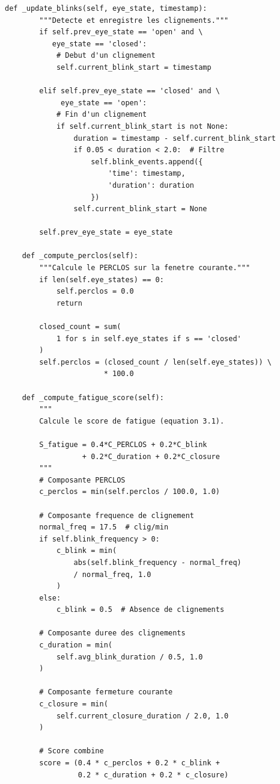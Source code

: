 \documentclass[12pt,a4paper,twoside]{report}
\begin{document}
\begin{lstlisting}[style=pythonstyle, caption={Module d'analyse comportementale.}, label={lst:behavioral}]
    def _update_blinks(self, eye_state, timestamp):
        """Detecte et enregistre les clignements."""
        if self.prev_eye_state == 'open' and \
           eye_state == 'closed':
            # Debut d'un clignement
            self.current_blink_start = timestamp
        
        elif self.prev_eye_state == 'closed' and \
             eye_state == 'open':
            # Fin d'un clignement
            if self.current_blink_start is not None:
                duration = timestamp - self.current_blink_start
                if 0.05 < duration < 2.0:  # Filtre
                    self.blink_events.append({
                        'time': timestamp,
                        'duration': duration
                    })
                self.current_blink_start = None
        
        self.prev_eye_state = eye_state
    
    def _compute_perclos(self):
        """Calcule le PERCLOS sur la fenetre courante."""
        if len(self.eye_states) == 0:
            self.perclos = 0.0
            return
        
        closed_count = sum(
            1 for s in self.eye_states if s == 'closed'
        )
        self.perclos = (closed_count / len(self.eye_states)) \
                       * 100.0
    
    def _compute_fatigue_score(self):
        """
        Calcule le score de fatigue (equation 3.1).
        
        S_fatigue = 0.4*C_PERCLOS + 0.2*C_blink 
                  + 0.2*C_duration + 0.2*C_closure
        """
        # Composante PERCLOS
        c_perclos = min(self.perclos / 100.0, 1.0)
        
        # Composante frequence de clignement
        normal_freq = 17.5  # clig/min
        if self.blink_frequency > 0:
            c_blink = min(
                abs(self.blink_frequency - normal_freq) 
                / normal_freq, 1.0
            )
        else:
            c_blink = 0.5  # Absence de clignements
        
        # Composante duree des clignements
        c_duration = min(
            self.avg_blink_duration / 0.5, 1.0
        )
        
        # Composante fermeture courante
        c_closure = min(
            self.current_closure_duration / 2.0, 1.0
        )
        
        # Score combine
        score = (0.4 * c_perclos + 0.2 * c_blink + 
                 0.2 * c_duration + 0.2 * c_closure)
        

\end{lstlisting}
\end{document}
